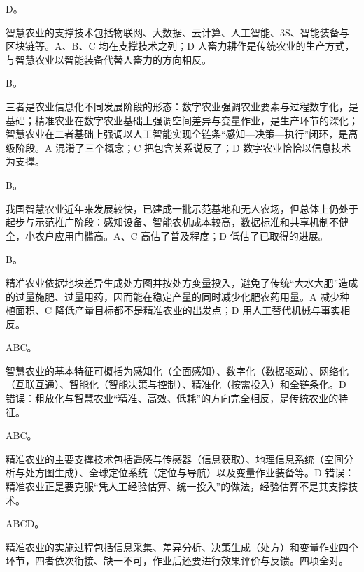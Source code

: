 \documentclass[a4paper,11pt]{article}
\begin{document}
\q D。\begin{analysis}智慧农业的支撑技术包括物联网、大数据、云计算、人工智能、3S、智能装备与区块链等。A、B、C 均在支撑技术之列；D 人畜力耕作是传统农业的生产方式，与智慧农业以智能装备代替人畜力的方向相反。\end{analysis}

\q B。\begin{analysis}三者是农业信息化不同发展阶段的形态：数字农业强调农业要素与过程数字化，是基础；精准农业在数字农业基础上强调空间差异与变量作业，是生产环节的深化；智慧农业在二者基础上强调以人工智能实现全链条“感知—决策—执行”闭环，是高级阶段。A 混淆了三个概念；C 把包含关系说反了；D 数字农业恰恰以信息技术为支撑。\end{analysis}

\q B。\begin{analysis}我国智慧农业近年来发展较快，已建成一批示范基地和无人农场，但总体上仍处于起步与示范推广阶段：感知设备、智能农机成本较高，数据标准和共享机制不健全，小农户应用门槛高。A、C 高估了普及程度；D 低估了已取得的进展。\end{analysis}

\q B。\begin{analysis}精准农业依据地块差异生成处方图并按处方变量投入，避免了传统“大水大肥”造成的过量施肥、过量用药，因而能在稳定产量的同时减少化肥农药用量。A 减少种植面积、C 降低产量目标都不是精准农业的出发点；D 用人工替代机械与事实相反。\end{analysis}


\q ABC。\begin{analysis}智慧农业的基本特征可概括为感知化（全面感知）、数字化（数据驱动）、网络化（互联互通）、智能化（智能决策与控制）、精准化（按需投入）和全链条化。D 错误：粗放化与智慧农业“精准、高效、低耗”的方向完全相反，是传统农业的特征。\end{analysis}

\q ABC。\begin{analysis}精准农业的主要支撑技术包括遥感与传感器（信息获取）、地理信息系统（空间分析与处方图生成）、全球定位系统（定位与导航）以及变量作业装备等。D 错误：精准农业正是要克服“凭人工经验估算、统一投入”的做法，经验估算不是其支撑技术。\end{analysis}

\q ABCD。\begin{analysis}精准农业的实施过程包括信息采集、差异分析、决策生成（处方）和变量作业四个环节，四者依次衔接、缺一不可，作业后还要进行效果评价与反馈。四项全对。\end{analysis}
\end{document}
